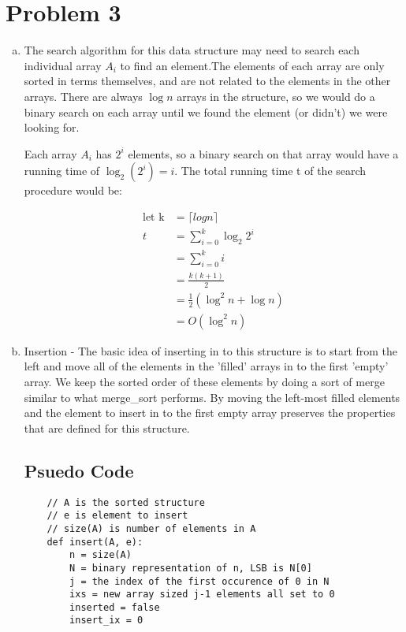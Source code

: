\documentclass[a4paper,12pt]{article}
\begin{document}
\section*{Problem 3}

\begin{enumerate}[a)]

  \item
    The search algorithm for this data structure may need to search each individual array
    \(A_i\) to find an element.The elements of each array are only sorted in terms 
    themselves, and are not related to the elements in the other arrays. There are always
    \(\log n\) arrays in the structure, so we would do a binary search on each array 
    until we found the element (or didn't) we were looking for.

    \noindent Each array \(A_i\) has \(2^i\) elements, so a binary search on that
    array would have a running time of \(\log_2(2^i) = i \). The total running time t 
    of the search procedure would be:

    \begin{align*}
      \text{let k}& = \lceil log n \rceil\\
        t& = \sum_{i=0}^k \log_2 2^i\\
        & = \sum_{i=0}^k i\\
        & = \frac{k(k+1)}{2}\\
        & = \frac{1}{2}\left(\log^2 n + \log n\right) \\
        & = O(\log^2 n)
    \end{align*}

  \item Insertion - The basic idea of inserting in to this structure is to start from
    the left and move all of the elements in the 'filled' arrays in to the first
    'empty' array. We keep the sorted order of these elements by doing a sort of 
    merge similar to what merge\_sort performs. By moving the left-most filled elements
    and the element to insert in to the first empty array preserves the properties
    that are defined for this structure.

  \subsection*{Psuedo Code}

  \begin{verbatim}
    // A is the sorted structure 
    // e is element to insert
    // size(A) is number of elements in A
    def insert(A, e):
        n = size(A)
        N = binary representation of n, LSB is N[0]
        j = the index of the first occurence of 0 in N
        ixs = new array sized j-1 elements all set to 0 
        inserted = false
        insert_ix = 0 


\end{verbatim}
\end{enumerate}
\end{document}
